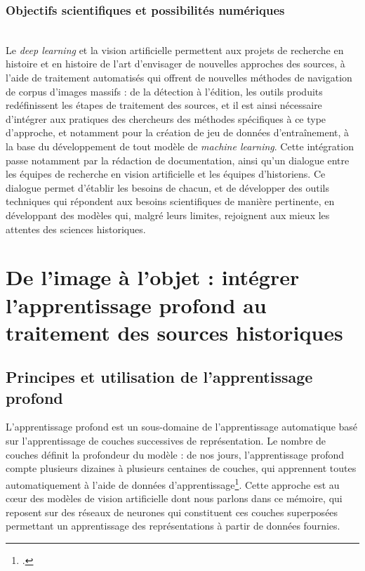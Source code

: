 \documentclass[a4paper,12pt,twoside]{book}
\newcommand{\dl}{\textit{deep learning}\xspace}
\newcommand{\ml}{\textit{machine learning}\xspace}
\newcommand{\clearemptydoublepage}{\newpage{\pagestyle{empty}\cleardoublepage}}
\begin{document}
                \section{\label{objectifsPossibilites}Objectifs scientifiques et possibilités numériques}
                    
        \\
        
        Le \dl et la vision artificielle permettent aux projets de recherche en histoire et en histoire de l'art d'envisager de nouvelles approches des sources, à l'aide de traitement automatisés qui offrent de nouvelles méthodes de navigation de corpus d'images massifs : de la détection à l'édition, les outils produits redéfinissent les étapes de traitement des sources, et il est ainsi nécessaire d'intégrer aux pratiques des chercheurs des méthodes spécifiques à ce type d'approche, et notamment pour la création de jeu de données d'entraînement, à la base du développement de tout modèle de \ml. Cette intégration passe notamment par la rédaction de documentation, ainsi qu'un dialogue entre les équipes de recherche en vision artificielle et les équipes d'historiens. Ce dialogue permet d'établir les besoins de chacun, et de développer des outils techniques qui répondent aux besoins scientifiques de manière pertinente, en développant des modèles qui, malgré leurs limites, rejoignent aux mieux les attentes des sciences historiques.
        \clearemptydoublepage


    \part{De l’image à l’objet : intégrer l’apprentissage profond au traitement des sources historiques}
        \chapter[L'apprentissage profond]{Principes et utilisation de l’apprentissage profond}
        
        L'apprentissage profond est un sous-domaine de l'apprentissage automatique basé sur l'apprentissage de couches successives de représentation. Le nombre de couches définit la profondeur du modèle : de nos jours, l'apprentissage profond compte plusieurs dizaines à plusieurs centaines de couches, qui apprennent toutes automatiquement à l'aide de données d'apprentissage\footcite{cholletApprentissageProfondAvec2020a}. Cette approche est au cœur des modèles de vision artificielle dont nous parlons dans ce mémoire, qui reposent sur des réseaux de neurones qui constituent ces couches superposées permettant un apprentissage des représentations à partir de données fournies.
        
\end{document}

